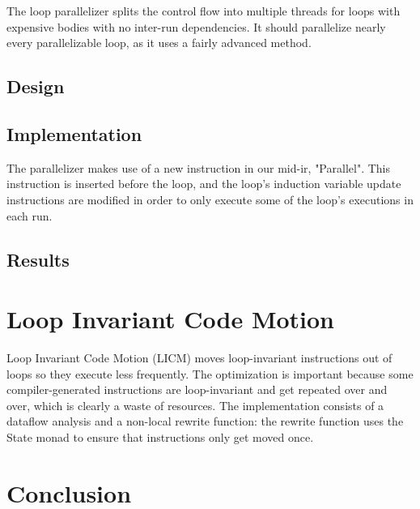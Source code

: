 \documentclass[11pt]{article}
\begin{document}
The loop parallelizer splits the control flow into multiple threads
for loops with expensive bodies with no inter-run dependencies.
It should parallelize nearly every parallelizable loop, as it uses a
fairly advanced method.

\subsection{Design}

\subsection{Implementation}


The parallelizer makes use of a new instruction in our mid-ir,
"Parallel". This instruction is inserted before the loop, and the
loop's induction variable update instructions are modified in order to
only execute some of the loop's executions in each run.


\subsection{Results}


\section{Loop Invariant Code Motion}

Loop Invariant Code Motion (LICM) moves loop-invariant instructions
out of loops so they execute less frequently. The optimization is
important because some compiler-generated instructions are
loop-invariant and get repeated over and over, which is clearly a
waste of resources. The implementation consists of a dataflow analysis
and a non-local rewrite function: the rewrite function uses the State
monad to ensure that instructions only get moved once.

\section{Conclusion}
\end{document}
